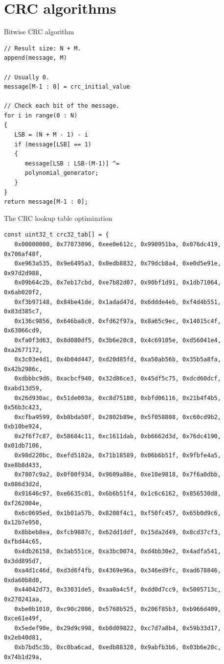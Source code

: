 \documentclass[10pt]{beamer}
\begin{document}
\section[CRC algorithms]{CRC algorithms}

\begin{frame}[fragile]{Bitwise CRC algorithm}
\begin{verbatim}
// Result size: N + M.
append(message, M)

// Usually 0.
message[M-1 : 0] = crc_initial_value

// Check each bit of the message.
for i in range(0 : N) 
{
   LSB = (N + M - 1) - i
   if (message[LSB] == 1)
   {
      message[LSB : LSB-(M-1)] ^= 
      polynomial_generator;
   }
}
return message[M-1 : 0];
\end{verbatim}
\end{frame}


\begin{frame}[fragile]{The CRC lookup table optimization}
\begin{scriptsize}
\begin{verbatim}
const uint32_t crc32_tab[] = {
   0x00000000, 0x77073096, 0xee0e612c, 0x990951ba, 0x076dc419, 0x706af48f,
   0xe963a535, 0x9e6495a3, 0x0edb8832, 0x79dcb8a4, 0xe0d5e91e, 0x97d2d988,
   0x09b64c2b, 0x7eb17cbd, 0xe7b82d07, 0x90bf1d91, 0x1db71064, 0x6ab020f2,
   0xf3b97148, 0x84be41de, 0x1adad47d, 0x6ddde4eb, 0xf4d4b551, 0x83d385c7,
   0x136c9856, 0x646ba8c0, 0xfd62f97a, 0x8a65c9ec, 0x14015c4f, 0x63066cd9,
   0xfa0f3d63, 0x8d080df5, 0x3b6e20c8, 0x4c69105e, 0xd56041e4, 0xa2677172,
   0x3c03e4d1, 0x4b04d447, 0xd20d85fd, 0xa50ab56b, 0x35b5a8fa, 0x42b2986c,
   0xdbbbc9d6, 0xacbcf940, 0x32d86ce3, 0x45df5c75, 0xdcd60dcf, 0xabd13d59,
   0x26d930ac, 0x51de003a, 0xc8d75180, 0xbfd06116, 0x21b4f4b5, 0x56b3c423,
   0xcfba9599, 0xb8bda50f, 0x2802b89e, 0x5f058808, 0xc60cd9b2, 0xb10be924,
   0x2f6f7c87, 0x58684c11, 0xc1611dab, 0xb6662d3d, 0x76dc4190, 0x01db7106,
   0x98d220bc, 0xefd5102a, 0x71b18589, 0x06b6b51f, 0x9fbfe4a5, 0xe8b8d433,
   0x7807c9a2, 0x0f00f934, 0x9609a88e, 0xe10e9818, 0x7f6a0dbb, 0x086d3d2d,
   0x91646c97, 0xe6635c01, 0x6b6b51f4, 0x1c6c6162, 0x856530d8, 0xf262004e,
   0x6c0695ed, 0x1b01a57b, 0x8208f4c1, 0xf50fc457, 0x65b0d9c6, 0x12b7e950,
   0x8bbeb8ea, 0xfcb9887c, 0x62dd1ddf, 0x15da2d49, 0x8cd37cf3, 0xfbd44c65,
   0x4db26158, 0x3ab551ce, 0xa3bc0074, 0xd4bb30e2, 0x4adfa541, 0x3dd895d7,
   0xa4d1c46d, 0xd3d6f4fb, 0x4369e96a, 0x346ed9fc, 0xad678846, 0xda60b8d0,
   0x44042d73, 0x33031de5, 0xaa0a4c5f, 0xdd0d7cc9, 0x5005713c, 0x270241aa,
   0xbe0b1010, 0xc90c2086, 0x5768b525, 0x206f85b3, 0xb966d409, 0xce61e49f,
   0x5edef90e, 0x29d9c998, 0xb0d09822, 0xc7d7a8b4, 0x59b33d17, 0x2eb40d81,
   0xb7bd5c3b, 0xc0ba6cad, 0xedb88320, 0x9abfb3b6, 0x03b6e20c, 0x74b1d29a,
\end{verbatim}
\end{scriptsize}
\end{frame}
\end{document}
